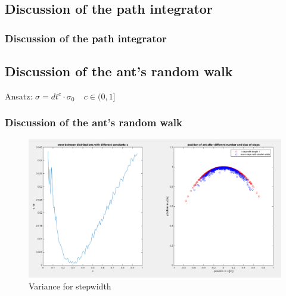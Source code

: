 \documentclass[ignorenonframetext]{beamer}
\begin{document}
\subsection{Discussion of the path integrator}
\begin{frame}
\frametitle{Discussion of the path integrator}








\end{frame}



\subsection{Discussion of the ant's random walk}
\begin{frame}
Ansatz: $\sigma = dt^{c} \cdot \sigma_{0} \ \ \ \ \ c \in (0,1]$ 



\frametitle{Discussion of the ant's random walk}
\begin{figure}[H]
\centering
\includegraphics[scale=0.2]{./Pics/VarianceForStepWidth_plot.png} 
\caption{Variance for stepwidth}
\end{figure} 
\end{frame}
\end{document}
